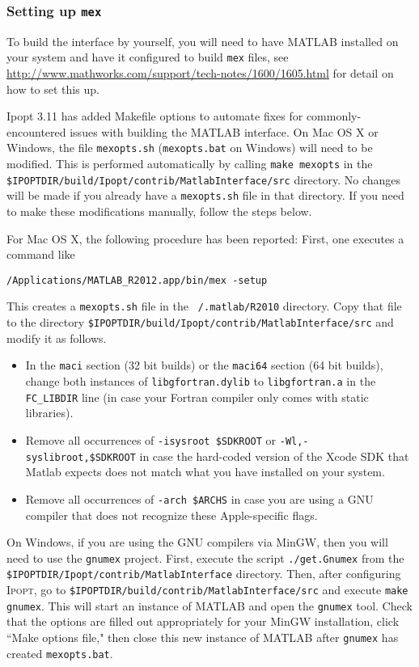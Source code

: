 \documentclass[10pt]{article}
\newcommand{\Ipopt}{\textsc{Ipopt}\xspace}
\newcommand{\Matlab}{\textsc{MATLAB}\xspace}
\begin{document}
\subsubsection{Setting up {\tt mex}}

To build the interface by yourself, you will need to have \Matlab installed on 
your system and have it configured to build {\tt mex} files,  see 
\url{http://www.mathworks.com/support/tech-notes/1600/1605.html} for detail on 
how to set this up.

Ipopt 3.11 has added Makefile options to automate fixes for commonly-encountered
issues with building the \Matlab interface. On Mac OS X or Windows, the file
{\tt mexopts.sh} ({\tt mexopts.bat} on Windows) will need to be modified.
This is performed automatically by calling {\tt make mexopts} in the
{\tt \$IPOPTDIR/build/Ipopt/contrib/MatlabInterface/src} directory. No changes
will be made if you already have a {\tt mexopts.sh} file in that directory.
If you need to make these modifications manually, follow the steps below.


For Mac OS X, the following procedure has been reported: First, one executes a command like
\begin{verbatim}
/Applications/MATLAB_R2012.app/bin/mex -setup
\end{verbatim}
This creates a {\tt mexopts.sh} file in the {\tt ~/.matlab/R2010} directory. 
Copy that file to the directory {\tt \$IPOPTDIR/build/Ipopt/contrib/MatlabInterface/src}
and modify it as follows.
\begin{itemize}
\item In the {\tt maci} section (32 bit builds) or the {\tt maci64} section
(64 bit builds), change both instances of {\tt libgfortran.dylib} to
{\tt libgfortran.a} in the {\tt FC\_LIBDIR} line (in case your Fortran
compiler only comes with static libraries).
\item Remove all occurrences of {\tt -isysroot \$SDKROOT} or
{\tt -Wl,-syslibroot,\$SDKROOT} in case the hard-coded version of the Xcode
SDK that Matlab expects does not match what you have installed on your system.
\item Remove all occurrences of {\tt -arch \$ARCHS} in case you are using a
GNU compiler that does not recognize these Apple-specific flags.
\end{itemize}

On Windows, if you are using the GNU compilers via MinGW, then you will need
to use the {\tt gnumex} project. First, execute the script {\tt ./get.Gnumex}
from the {\tt \$IPOPTDIR/Ipopt/contrib/MatlabInterface} directory. Then, after
configuring \Ipopt, go to {\tt \$IPOPTDIR/build/contrib/MatlabInterface/src}
and execute {\tt make gnumex}. This will start an instance of \Matlab and open
the {\tt gnumex} tool. Check that the options are filled out appropriately for
your MinGW installation, click ``Make options file," then close this new instance
of \Matlab after {\tt gnumex} has created {\tt mexopts.bat}.
\end{document}
